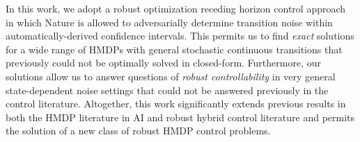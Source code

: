 In this work, we adopt a robust optimization receding horizon control
approach in which Nature is allowed to adversarially determine
transition noise within automatically-derived confidence intervals.
This permits us to find \emph{exact} solutions for a wide range of
HMDPs with general stochastic continuous transitions that previously
could not be optimally solved in closed-form.  Furthermore, our
solutions allow us to answer questions of \emph{robust
controllability} in very general state-dependent noise settings that
could not be answered previously in the control literature.
Altogether, this work significantly extends previous results in both
the HMDP literature in AI and robust hybrid control literature
and permits the solution of a new class of robust HMDP control problems.


